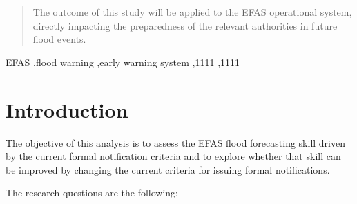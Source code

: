 \documentclass[preprint,12pt]{elsarticle}
\begin{document}
\begin{frontmatter}
\begin{abstract}
The outcome of this study will be applied to the EFAS operational system, directly impacting the preparedness of the relevant authorities in future flood events.

\end{abstract}



\begin{keyword}
EFAS \sep flood warning \sep early warning system
 \sep 1111
 \sep 1111
\end{keyword}

\end{frontmatter}


\section{Introduction}
\label{sec:introduction}

The objective of this analysis is to assess the EFAS flood forecasting skill driven by the current formal notification criteria and to explore whether that skill can be improved by changing the current criteria for issuing formal notifications.

The research questions are the following:
\end{document}
